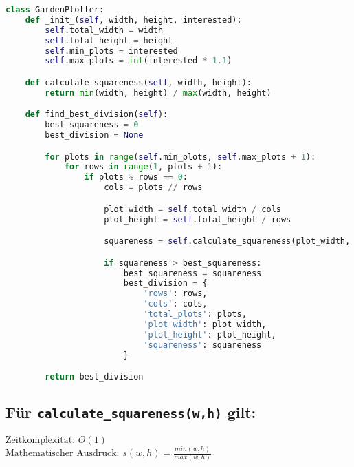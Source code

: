 \documentclass[a4paper,10pt,ngerman]{scrartcl}
\begin{document}
\begin{lstlisting}[language=Python]
class GardenPlotter:
    def _init_(self, width, height, interested):
        self.total_width = width
        self.total_height = height
        self.min_plots = interested
        self.max_plots = int(interested * 1.1)

    def calculate_squareness(self, width, height):
        return min(width, height) / max(width, height)

    def find_best_division(self):
        best_squareness = 0
        best_division = None

        for plots in range(self.min_plots, self.max_plots + 1):
            for rows in range(1, plots + 1):
                if plots % rows == 0:
                    cols = plots // rows

                    plot_width = self.total_width / cols
                    plot_height = self.total_height / rows

                    squareness = self.calculate_squareness(plot_width, plot_height)

                    if squareness > best_squareness:
                        best_squareness = squareness
                        best_division = {
                            'rows': rows,
                            'cols': cols,
                            'total_plots': plots,
                            'plot_width': plot_width,
                            'plot_height': plot_height,
                            'squareness': squareness
                        }

        return best_division
\end{lstlisting}

\subsection{Für \texttt{calculate\_squareness(w,h)} gilt:}
$\text{Zeitkomplexität: } O(1)$\\
$\text{Mathematischer Ausdruck: }s(w,h)=\frac{min(w, h)}{max(w, h)}$\\
\end{document}
